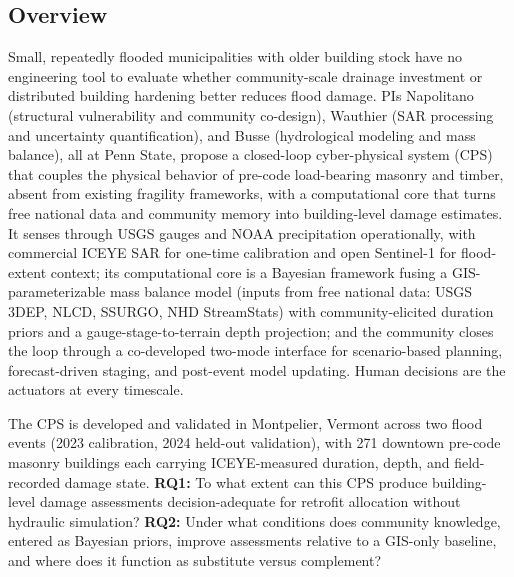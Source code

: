 \documentclass[11pt]{article}
\begin{document}
\pagestyle{empty}

\vspace{-0.5cm}
\subsection{Overview}
\vspace{-0.3cm}
Small, repeatedly flooded municipalities with older building stock have no
engineering tool to evaluate whether community-scale drainage investment or
distributed building hardening better reduces flood damage.
PIs Napolitano (structural vulnerability and community co-design),
Wauthier (SAR processing and uncertainty quantification),
and Busse (hydrological modeling and mass balance),
all at Penn State,
propose a closed-loop cyber-physical system (CPS) that couples the physical
behavior of pre-code load-bearing masonry and timber, absent from existing
fragility frameworks, with a computational core that turns free national data
and community memory into building-level damage estimates.
It senses through USGS gauges and NOAA precipitation operationally, with
commercial ICEYE SAR for one-time calibration and open Sentinel-1 for
flood-extent context; its computational core is a Bayesian framework fusing a
GIS-parameterizable mass balance model (inputs from free national data: USGS
3DEP, NLCD, SSURGO, NHD StreamStats) with community-elicited duration priors
and a gauge-stage-to-terrain depth projection; and the community closes the
loop through a co-developed two-mode interface for scenario-based planning,
forecast-driven staging, and post-event model updating.
Human decisions are the actuators at every timescale.

The CPS is developed and validated in Montpelier, Vermont across two flood
events (2023 calibration, 2024 held-out validation), with 271 downtown pre-code
masonry buildings each carrying ICEYE-measured duration, depth, and field-recorded
damage state.
\textbf{RQ1:} To what extent can this CPS produce building-level damage
assessments decision-adequate for retrofit allocation without hydraulic simulation?
\textbf{RQ2:} Under what conditions does community knowledge, entered as Bayesian
priors, improve assessments relative to a GIS-only baseline, and where does it
function as substitute versus complement?

\vspace{-0.5cm}
\end{document}
